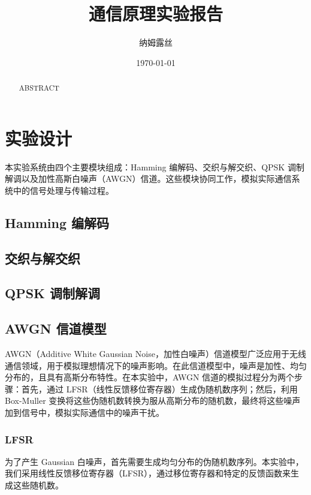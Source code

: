 \documentclass[a4paper]{article}  %
\begin{document}
\title{\textbf{通信原理实验报告}}
\author{纳姆露丝}
\date{\today}
\maketitle

\tableofcontents

\newpage

\begin{abstract}
    ABSTRACT
\end{abstract}

\section{实验设计}

本实验系统由四个主要模块组成：Hamming 编解码、交织与解交织、QPSK 调制解调以及加性高斯白噪声（AWGN）信道。这些模块协同工作，模拟实际通信系统中的信号处理与传输过程。

\subsection{Hamming 编解码}

\subsection{交织与解交织}

\subsection{QPSK 调制解调}

\subsection{AWGN 信道模型}

AWGN（Additive White Gaussian Noise，加性白噪声）信道模型广泛应用于无线通信领域，用于模拟理想情况下的噪声影响。在此信道模型中，噪声是加性、均匀分布的，且具有高斯分布特性。在本实验中，AWGN 信道的模拟过程分为两个步骤：首先，通过 LFSR（线性反馈移位寄存器）生成伪随机数序列；然后，利用 Box-Muller 变换将这些伪随机数转换为服从高斯分布的随机数，最终将这些噪声加到信号中，模拟实际通信中的噪声干扰。

\subsubsection{LFSR}

为了产生 Gaussian 白噪声，首先需要生成均匀分布的伪随机数序列。本实验中，我们采用线性反馈移位寄存器（LFSR），通过移位寄存器和特定的反馈函数来生成这些随机数。
\end{document}
